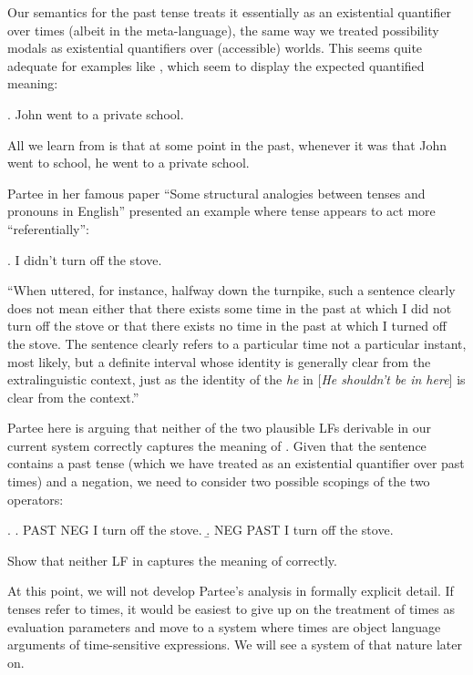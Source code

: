 Our semantics for the past tense treats it essentially as an existential quantifier over times (albeit in the meta-language), the same way we treated possibility modals as existential quantifiers over (accessible) worlds. This seems quite adequate for examples like \Next, which seem to display the expected quantified meaning:

\ex. John went to a private school.

All we learn from \Last is that at some point in the past, whenever it was that John went to school, he went to a private school.

Partee in her famous paper ``Some structural analogies between tenses and pronouns in English'' \citep{partee:1973:analogies} presented an example where tense appears to act more ``referentially'':

\ex. I didn't turn off the stove.

``When uttered, for instance, halfway down the turnpike, such a sentence clearly does not mean either that there exists some time in the past at which I did not turn off the stove or that there exists no time in the past at which I turned off the stove. The sentence clearly refers to a particular time \dash not a particular instant, most likely, but a definite interval whose identity is generally clear from the extralinguistic context, just as the identity of the \emph{he} in [\emph{He shouldn't be in here}] is clear from the context.''

Partee here is arguing that neither of the two plausible LFs derivable in our current system correctly captures the meaning of \Last. Given that the sentence contains a past tense (which we have treated as an existential quantifier over past times) and a negation, we need to consider two possible scopings of the two operators:

\ex. \a. PAST NEG I turn off the stove.
\b. NEG PAST I turn off the stove.

\begin{exercise}
	
Show that neither LF in \Last captures the meaning of \LLast correctly.\eex

\end{exercise}

At this point, we will not develop Partee's analysis in formally explicit detail. If tenses refer to times, it would be easiest to give up on the treatment of times as evaluation parameters and move to a system where times are object language arguments of time-sensitive expressions. We will see a system of that nature later on.

